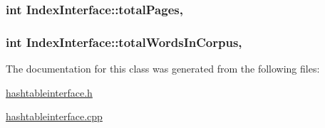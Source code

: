 \subsubsection[{total\+Pages}]{\setlength{\rightskip}{0pt plus 5cm}int Index\+Interface\+::total\+Pages\hspace{0.3cm}{\ttfamily [protected]}, {\ttfamily [inherited]}}\label{class_index_interface_a2df695d2b504f2e53a0bfdd6bfee31da}
\hypertarget{class_index_interface_ab607b430e78528cdb8bb79ba4afa91d2}{}
\subsubsection[{total\+Words\+In\+Corpus}]{\setlength{\rightskip}{0pt plus 5cm}int Index\+Interface\+::total\+Words\+In\+Corpus\hspace{0.3cm}{\ttfamily [protected]}, {\ttfamily [inherited]}}\label{class_index_interface_ab607b430e78528cdb8bb79ba4afa91d2}


The documentation for this class was generated from the following files\+:\begin{DoxyCompactItemize}
\item 
\hyperlink{hashtableinterface_8h}{hashtableinterface.\+h}\item 
\hyperlink{hashtableinterface_8cpp}{hashtableinterface.\+cpp}\end{DoxyCompactItemize}
